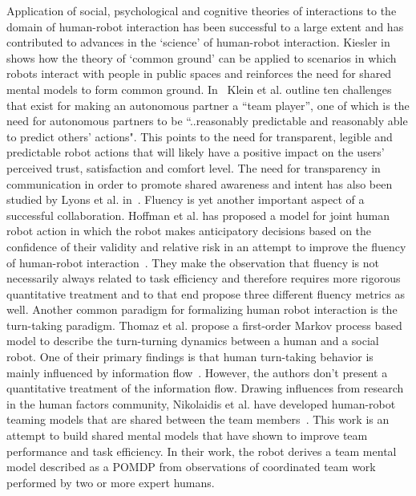 \documentclass[12pt]{article}
\begin{document}
Application of social, psychological and cognitive theories of interactions to the domain of human-robot interaction has been successful to a large extent and has contributed to advances in the `science' of human-robot interaction. Kiesler in~\cite{kiesler2005fostering} shows how the theory of `common ground' can be applied to scenarios in which robots interact with people in public spaces and reinforces the need for shared mental models to form common ground. In~\cite{klien2004ten} Klein et al. outline ten challenges that exist for making an autonomous partner a ``team player'', one of which is the need for autonomous partners to be ``..reasonably predictable and reasonably able to predict others' actions". This points to the need for transparent, legible and predictable robot actions that will likely have a positive impact on the users' perceived trust, satisfaction and comfort level. The need for transparency in communication in order to promote shared awareness and intent has also been studied by Lyons et al. in~\cite{lyons2014transparency}. Fluency is yet another important aspect of a successful collaboration. Hoffman et al. has proposed a model for joint human robot action in which the robot makes anticipatory decisions based on the confidence of their validity and relative risk in an attempt to improve the fluency of human-robot interaction~\cite{hoffman2007cost}. They make the observation that fluency is not necessarily always related to task efficiency and therefore requires more rigorous quantitative treatment and to that end propose three different fluency metrics as well. Another common paradigm for formalizing human robot interaction is the turn-taking paradigm. Thomaz et al. propose a first-order Markov process based model to describe the turn-turning dynamics between a human and a social robot. One of their primary findings is that human turn-taking behavior is mainly influenced by information flow~\cite{thomaz2011turn}. However, the authors don't present a quantitative treatment of the information flow. Drawing influences from research in the human factors community, Nikolaidis et al. have developed human-robot teaming models that are shared between the team members~\cite{nikolaidis2012human}. This work is an attempt to build shared mental models that have shown to improve team performance and task efficiency. In their work, the robot derives a team mental model described as a POMDP from observations of coordinated team work performed by two or more expert humans. 
\end{document}
